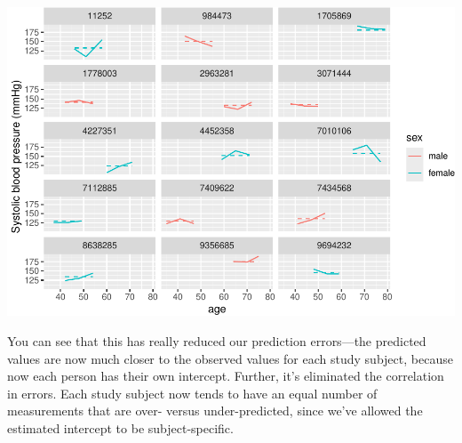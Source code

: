 \documentclass[
]{book}
\newenvironment{Shaded}{\begin{snugshade}}{\end{snugshade}}
\newcommand{\DataTypeTok}[1]{\textcolor[rgb]{0.13,0.29,0.53}{#1}}
\newcommand{\DecValTok}[1]{\textcolor[rgb]{0.00,0.00,0.81}{#1}}
\newcommand{\KeywordTok}[1]{\textcolor[rgb]{0.13,0.29,0.53}{\textbf{#1}}}
\newcommand{\NormalTok}[1]{#1}
\newcommand{\OperatorTok}[1]{\textcolor[rgb]{0.81,0.36,0.00}{\textbf{#1}}}
\newcommand{\StringTok}[1]{\textcolor[rgb]{0.31,0.60,0.02}{#1}}
\begin{document}
\begin{Shaded}
\end{Shaded}

\includegraphics{adv_epi_analysis_files/figure-latex/unnamed-chunk-291-1.pdf}

You can see that this has really reduced our prediction errors---the predicted
values are now much closer to the observed values for each study subject,
because now each person has their own intercept. Further, it's eliminated the
correlation in errors. Each study subject now tends to have an equal number of
measurements that are over- versus under-predicted, since we've allowed the
estimated intercept to be subject-specific.
\end{document}
